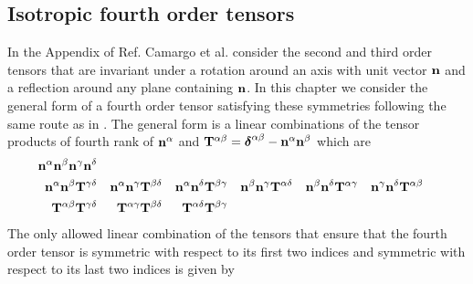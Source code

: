 \documentclass[b5paper,openright,11pt]{book}
\begin{document}
\begin{appendices}
\chapter{Isotropic fourth order tensors}
\label{Ap:Iso}
In the  Appendix of  Ref. \cite{CamargoBC2018}  Camargo et al. consider  the second  and third
order tensors that are invariant under  a rotation around an axis with
unit vector  ${\bf n}$  and a  reflection around any
plane containing ${\bf n}$. In this chapter  we consider  the general
form  of a  fourth order  tensor satisfying these symmetries following the same route as in \cite{CamargoBC2018}.
The general  form  is  a linear  combinations  of the  tensor
products      of     fourth      rank     of      ${\bf     n}^\alpha$
and ${\bf T}^{\alpha\beta}=\boldsymbol{\delta}^{\alpha\beta}-{\bf n}^{\alpha}{\bf n}^{\beta}$ which are
\begin{align}
 {\bf n}^\alpha  {\bf n}^\beta   {\bf n}^\gamma   {\bf n}^\delta && && && && && &&
\nonumber\\
{\bf n}^\alpha  {\bf n}^\beta {\bf T}^{\gamma\delta} &&  
{\bf n}^\alpha  {\bf n}^\gamma {\bf T}^{\beta\delta} &&
{\bf n}^\alpha  {\bf n}^\delta {\bf T}^{\beta\gamma} &&
{\bf n}^\beta  {\bf n}^\gamma {\bf T}^{\alpha\delta} &&  
{\bf n}^\beta  {\bf n}^\delta {\bf T}^{\alpha\gamma} &&
{\bf n}^\gamma  {\bf n}^\delta {\bf T}^{\alpha\beta} &&
\nonumber\\
{\bf T}^{\alpha\beta}{\bf T}^{\gamma\delta}&&
{\bf T}^{\alpha\gamma}{\bf T}^{\beta\delta}&&
{\bf T}^{\alpha\delta}{\bf T}^{\beta\gamma}&& && && &&
\end{align}
The only  allowed linear combination  of the tensors that  ensure that
the fourth  order tensor is  symmetric with  respect to its  first two
indices and symmetric with respect to its last two indices is given by


\end{appendices}
\end{document}
